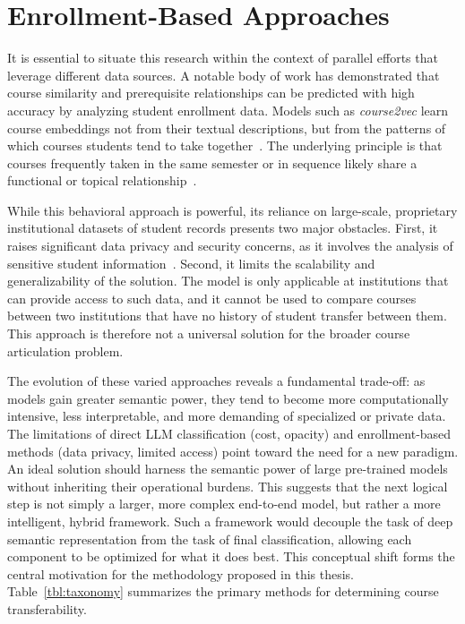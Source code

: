 \section{Enrollment-Based Approaches}
It is essential to situate this research within the context of parallel efforts that leverage different data sources. A notable body of work has demonstrated that course similarity and prerequisite relationships can be predicted with high accuracy by analyzing student enrollment data. Models such as \emph{course2vec} learn course embeddings not from their textual descriptions, but from the patterns of which courses students tend to take together~\cite{pardos2018connectionistrecommendationwildutility}. The underlying principle is that courses frequently taken in the same semester or in sequence likely share a functional or topical relationship~\cite{pardos2018connectionistrecommendationwildutility}.

While this behavioral approach is powerful, its reliance on large-scale, proprietary institutional datasets of student records presents two major obstacles. First, it raises significant data privacy and security concerns, as it involves the analysis of sensitive student information~\cite{slade10.1177/0002764213479366}. Second, it limits the scalability and generalizability of the solution. The model is only applicable at institutions that can provide access to such data, and it cannot be used to compare courses between two institutions that have no history of student transfer between them. This approach is therefore not a universal solution for the broader course articulation problem.

The evolution of these varied approaches reveals a fundamental trade-off: as models gain greater semantic power, they tend to become more computationally intensive, less interpretable, and more demanding of specialized or private data. The limitations of direct LLM classification (cost, opacity) and enrollment-based methods (data privacy, limited access) point toward the need for a new paradigm. An ideal solution should harness the semantic power of large pre-trained models without inheriting their operational burdens. This suggests that the next logical step is not simply a larger, more complex end-to-end model, but rather a more intelligent, hybrid framework. Such a framework would decouple the task of deep semantic representation from the task of final classification, allowing each component to be optimized for what it does best. This conceptual shift forms the central motivation for the methodology proposed in this thesis.  Table~\ref{tbl:taxonomy} summarizes the primary methods for determining course transferability.

